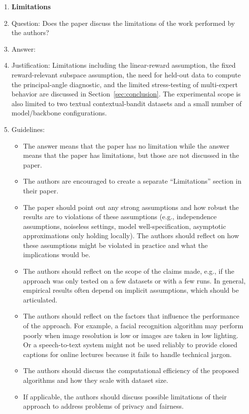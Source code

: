 \documentclass{article}
\theoremstyle{definition}
\theoremstyle{remark}
\theoremstyle{remark}
\begin{document}
\begin{enumerate}
\item {\bf Limitations}
    \item[] Question: Does the paper discuss the limitations of the work performed by the authors?
    \item[] Answer: \answerYes{} %
    \item[] Justification: Limitations including the linear-reward assumption, the fixed reward-relevant subspace assumption, the need for held-out data to compute the principal-angle diagnostic, and the limited stress-testing of multi-expert behavior are discussed in Section~\ref{sec:conclusion}. The experimental scope is also limited to two textual contextual-bandit datasets and a small number of model/backbone configurations.
    \item[] Guidelines:
    \begin{itemize}
        \item The answer \answerNA{} means that the paper has no limitation while the answer \answerNo{} means that the paper has limitations, but those are not discussed in the paper. 
        \item The authors are encouraged to create a separate ``Limitations'' section in their paper.
        \item The paper should point out any strong assumptions and how robust the results are to violations of these assumptions (e.g., independence assumptions, noiseless settings, model well-specification, asymptotic approximations only holding locally). The authors should reflect on how these assumptions might be violated in practice and what the implications would be.
        \item The authors should reflect on the scope of the claims made, e.g., if the approach was only tested on a few datasets or with a few runs. In general, empirical results often depend on implicit assumptions, which should be articulated.
        \item The authors should reflect on the factors that influence the performance of the approach. For example, a facial recognition algorithm may perform poorly when image resolution is low or images are taken in low lighting. Or a speech-to-text system might not be used reliably to provide closed captions for online lectures because it fails to handle technical jargon.
        \item The authors should discuss the computational efficiency of the proposed algorithms and how they scale with dataset size.
        \item If applicable, the authors should discuss possible limitations of their approach to address problems of privacy and fairness.

\end{itemize}
\end{enumerate}
\end{document}
